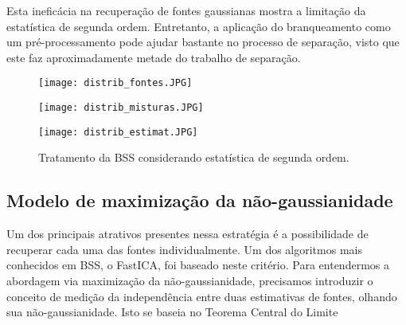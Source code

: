     Esta ineficácia na recuperação de fontes gaussianas mostra a limitação da estatística de segunda ordem. Entretanto, a aplicação do branqueamento como um pré-processamento pode ajudar bastante no processo de separação, visto que este faz aproximadamente metade do trabalho de separação.
    
  \begin{figure}
    \begin{subfigure}
    \begin{center}
        \texttt{[image: distrib\_fontes.JPG]}
        \caption{Distribuição conjunta das fontes.}
         \label{fig:orthogonalproblema}
    \end{center}
     \end{subfigure}
     \begin{subfigure}
     \begin{center}
        \texttt{[image: distrib\_misturas.JPG]}
         \caption{Distribuição conjunta das misturas.}
        \label{fig:orthogonalproblemb}
    \end{center}
     \end{subfigure}
     \begin{subfigure}
     \begin{center}
        \texttt{[image: distrib\_estimat.JPG]}
         \caption{Distribuição conjunta das estimativas obtidas a partir do braqueamento das misturas.}
                 \label{fig:orthogonalproblemc}
     \end{center}
     \end{subfigure}
     
  \caption{Tratamento da BSS considerando estatística de segunda ordem.}
  \label{fig:orthogonalproblem2}
\end{figure}

\subsection{Modelo de maximização da não-gaussianidade}
    
    Um dos principais atrativos presentes nessa estratégia é a possibilidade de recuperar cada uma das fontes individualmente. Um dos algoritmos mais conhecidos em BSS, o FastICA, foi baseado neste critério. Para entendermos a abordagem via maximização da não-gaussianidade, precisamos introduzir o conceito de medição da independência entre duas estimativas de fontes, olhando sua não-gaussianidade. Isto se baseia no Teorema Central do Limite \cite{central}
    
